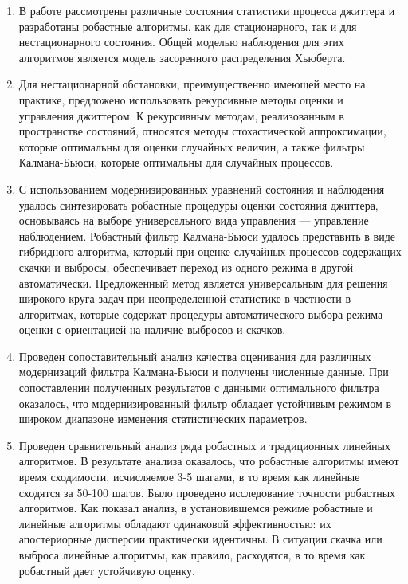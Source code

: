\begin{enumerate}
 \item
 В работе рассмотрены различные состояния статистики процесса джиттера и разработаны робастные алгоритмы, как для стационарного, так и для нестационарного состояния.
 Общей моделью наблюдения для этих алгоритмов является модель засоренного распределения Хьюберта.
 
 \item Для нестационарной обстановки, преимущественно имеющей место на практике, предложено использовать рекурсивные методы оценки и управления джиттером.
 К рекурсивным методам, реализованным в пространстве состояний, относятся методы стохастической аппроксимации, которые оптимальны для оценки случайных величин, 
 а также фильтры Калмана-Бьюси, которые оптимальны для случайных процессов.
 
 \item С использованием модернизированных уравнений состояния и наблюдения удалось синтезировать робастные процедуры оценки состояния джиттера, 
 основываясь на выборе универсального вида управления --- управление наблюдением.
 Робастный фильтр Калмана-Бьюси удалось представить в виде гибридного алгоритма, который при оценке случайных процессов содержащих скачки и выбросы, 
 обеспечивает переход из одного режима в другой автоматически.
 Предложенный метод является универсальным для решения широкого круга задач при неопределенной статистике в частности в алгоритмах, 
 которые содержат процедуры автоматического выбора режима оценки с ориентацией на наличие выбросов и скачков.
 
 \item Проведен сопоставительный анализ качества оценивания для различных модернизаций фильтра Калмана-Бьюси и получены численные данные.
 При сопоставлении полученных результатов с данными оптимального фильтра оказалось, что модернизированный фильтр обладает устойчивым режимом в широком диапазоне изменения статистических параметров.
 

 
 

 
 
 \item Проведен сравнительный анализ ряда робастных и традиционных линейных алгоритмов. 
 В результате анализа оказалось, что робастные алгоритмы имеют время сходимости, исчисляемое 3-5 шагами, в то время как линейные сходятся за 50-100 шагов.
 Было проведено исследование точности робастных алгоритмов.
 Как показал анализ, в установившемся режиме робастные и линейные алгоритмы обладают одинаковой эффективностью: их апостериорные дисперсии практически идентичны.
 В ситуации скачка или выброса линейные алгоритмы, как правило, расходятся, в то время как робастный дает устойчивую оценку.
 

\end{enumerate}

